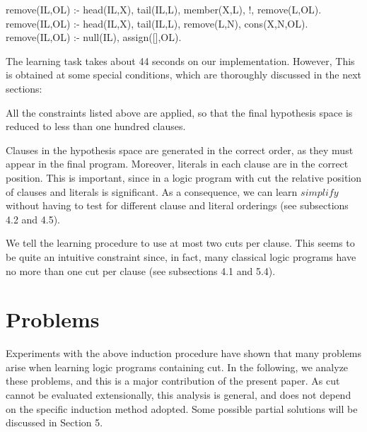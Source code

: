 \noindent
remove(IL,OL) :- head(IL,X), tail(IL,L), member(X,L), !, remove(L,OL).\\
remove(IL,OL) :- head(IL,X), tail(IL,L), remove(L,N), cons(X,N,OL).\\
remove(IL,OL) :- null(IL), assign([],OL).\\
 
\small
\normalsize
 
\noindent
The learning task takes about 44 seconds on our implementation. However,
This is obtained at some special conditions, which are thoroughly
discussed in the next sections:
 
\begin{itemize}
\begin{item}
All the constraints listed above are applied, so that the 
final hypothesis space is reduced to less than one hundred clauses.
\end{item}
\begin{item}
Clauses in the hypothesis space are generated in the correct
order, as they must appear in the final program. Moreover, literals
in each clause are in the correct position. This is important,
since in a logic program with cut the relative position of clauses
and literals is significant. As a consequence, we can learn $simplify$
without having to 
test for different clause and literal orderings (see subsections 4.2 and 4.5).
\end{item}
\begin{item}
We tell the learning procedure to use at most two cuts per clause.
This seems to be quite an intuitive constraint since,
in fact, many classical logic programs have no more than one cut
per clause (see subsections 4.1 and 5.4). 
\end{item}
\end{itemize}
 
\section{Problems}
Experiments with the above induction procedure have shown 
that many problems arise when learning logic programs 
containing cut. In the following, we analyze these problems, and this 
is a major contribution of the present paper. As cut cannot
be evaluated extensionally, this analysis is
general, and does not depend
on the specific induction method adopted. Some possible 
partial solutions will be discussed in Section 5.
 

